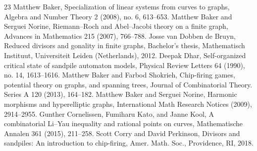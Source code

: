 \documentclass[10pt]{amsart}
\begin{document}
\begin{thebibliography}{23}
 Matthew Baker, Specialization of linear systems from curves to graphs, Algebra and Number Theory 2 (2008), no. 6, 613–653.
 Matthew Baker and Serguei Norine, Riemann–Roch and Abel–Jacobi theory on a finite graph, Advances in Mathematics 215 (2007), 766–788.
 Josse van Dobben de Bruyn, Reduced divisors and gonality in finite graphs, Bachelor’s thesis, Mathematisch Instituut, Universiteit Leiden (Netherlands), 2012.
 Deepak Dhar, Self-organized critical state of sandpile automaton models, Physical Review Letters 64 (1990), no. 14, 1613–1616.
 Matthew Baker and Farbod Shokrieh, Chip-firing games, potential theory on graphs, and spanning trees, Journal of Combinatorial Theory. Series A 120 (2013), 164–182.
 Matthew Baker and Serguei Norine, Harmonic morphisms and hyperelliptic graphs, International Math Research Notices (2009), 2914–2955.
 Gunther Cornelissen, Fumiharu Kato, and Janne Kool, A combinatorial Li–Yau inequality and rational points on curves, Mathematische Annalen 361 (2015), 211–258.
 Scott Corry and David Perkinson, Divisors and sandpiles: An introduction to chip-firing, Amer. Math. Soc., Providence, RI, 2018.
\end{thebibliography}
\end{document}
